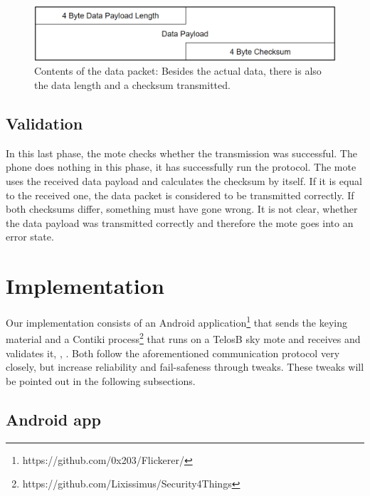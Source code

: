 \documentclass{sig-alternate} %
\begin{document}
\begin{figure}
	\centering
	\includegraphics[scale=.3]{images/data_packet.png}
	\caption{Contents of the data packet: Besides the actual data, there is also the data length and a checksum transmitted.}
	\label{fig:data_packet}
\end{figure}

\subsection{Validation}
\label{sub:validation}

In this last phase, the mote checks whether the transmission was successful.
The phone does nothing in this phase, it has successfully run the protocol.
The mote uses the received data payload and calculates the checksum by itself.
If it is equal to the received one, the data packet is considered to be transmitted correctly.
If both checksums differ, something must have gone wrong.
It is not clear, whether the data payload was transmitted correctly and therefore the mote goes into an error state.

\section{Implementation}
\label{sec:implementation}

Our implementation consists of an Android application\footnote{https://github.com/0x203/Flickerer/} that sends the keying material and a Contiki process\footnote{https://github.com/Lixissimus/Security4Things} that runs on a TelosB sky mote and receives and validates it, \cite{dunkels04contiki}, \cite{telosb}.
Both follow the aforementioned communication protocol very closely, but increase reliability and fail-safeness through tweaks. 
These tweaks will be pointed out in the following subsections.

\subsection{Android app}
\label{sub:android_app}
\end{document}
